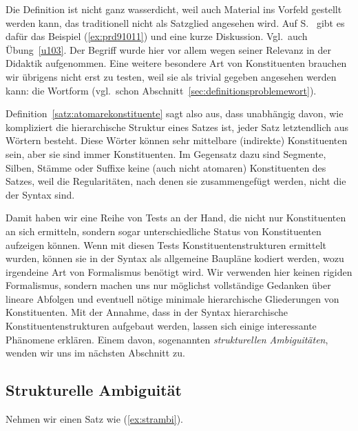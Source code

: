 Die Definition ist nicht ganz wasserdicht, weil auch Material ins Vorfeld gestellt werden kann, das traditionell nicht als Satzglied angesehen wird.
Auf S.~\pageref{abs:satzgliedfail} gibt es dafür das Beispiel (\ref{ex:prd91011}) und eine kurze Diskussion.
Vgl.\ auch Übung~\ref{u103}.
Der Begriff wurde hier vor allem wegen seiner Relevanz in der Didaktik aufgenommen.
Eine weitere besondere Art von Konstituenten brauchen wir übrigens nicht erst zu testen, weil sie als trivial gegeben angesehen werden kann: die Wortform (vgl.\ schon Abschnitt~\ref{sec:definitionsproblemewort}).


Definition~\ref{satz:atomarekonstituente} sagt also aus, dass unabhängig davon, wie kompliziert die hierarchische Struktur eines Satzes ist, jeder Satz letztendlich aus Wörtern besteht.
Diese Wörter können sehr mittelbare (indirekte) Konstituenten sein, aber sie sind immer Konstituenten.
Im Gegensatz dazu sind Segmente, Silben, Stämme oder Suffixe keine (auch nicht atomaren) Konstituenten des Satzes, weil die Regularitäten, nach denen sie zusammengefügt werden, nicht die der Syntax sind.

Damit haben wir eine Reihe von Tests an der Hand, die nicht nur Konstituenten an sich ermitteln, sondern sogar unterschiedliche Status von Konstituenten aufzeigen können.
Wenn mit diesen Tests Konstituentenstrukturen ermittelt wurden, können sie in der Syntax als allgemeine Baupläne kodiert werden, wozu irgendeine Art von Formalismus benötigt wird.
Wir verwenden hier keinen rigiden Formalismus, sondern machen uns nur möglichst vollständige Gedanken über lineare Abfolgen und eventuell nötige minimale hierarchische Gliederungen von Konstituenten.
Mit der Annahme, dass in der Syntax hierarchische Konstituentenstrukturen aufgebaut werden, lassen sich einige interessante Phänomene erklären.
Einem davon, sogenannten \textit{strukturellen Ambiguitäten}, wenden wir uns im nächsten Abschnitt zu.

\subsection{Strukturelle Ambiguität}

Nehmen wir einen Satz wie (\ref{ex:strambi}).

